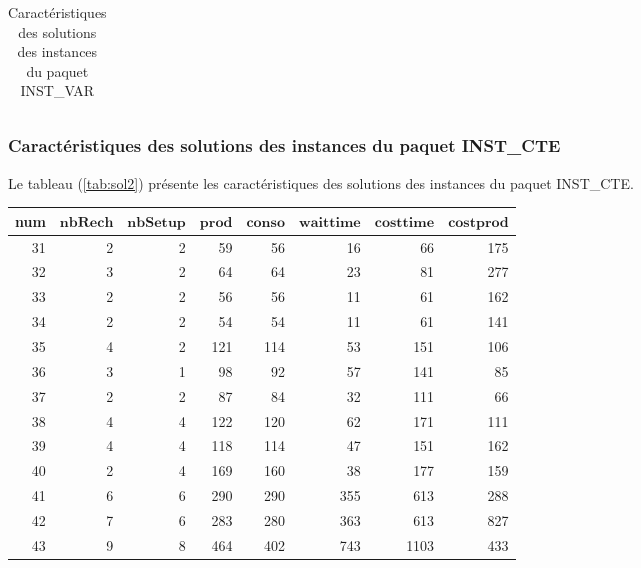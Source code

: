 {\begin{table}[H]
{\begin{tabular}{|r|r|r|r|r|r|r|r|}
			
			\bottomrule
		\end{tabular}%
	}\caption{Caractéristiques des solutions des instances du paquet INST\_VAR}
	\label{tab:sol}%
\end{table}%
\subsubsection{Caractéristiques des solutions des instances du paquet INST\_CTE}
Le tableau (\ref{tab:sol2}) présente les caractéristiques des solutions des instances du paquet INST\_CTE. %
\begin{table}[H]
	\centering
	\small{
		\begin{tabular}{|r|r|r|r|r|r|r|r|}
			\hline
			\toprule
			\rowcolor{cyan}	\textbf{num} &$\mathbf{nbRech}$ & $\mathbf{nbSetup}$ & $\mathbf{prod}$ &  $\mathbf{conso} $ & $\mathbf{wait time}$ & $\mathbf{cost time}$ & $\mathbf{cost prod}$  \\
			\midrule
			\hline
			31	&	2	&	2	&	59	&	56	&	16	&	66	&	175	\\ \hline
			32	&	3	&	2	&	64	&	64	&	23	&	81	&	277	\\ \hline
			33	&	2	&	2	&	56	&	56	&	11	&	61	&	162	\\ \hline
			34	&	2	&	2	&	54	&	54	&	11	&	61	&	141	\\ \hline
			35	&	4	&	2	&	121	&	114	&	53	&	151	&	106	\\ \hline
			36	&	3	&	1	&	98	&	92	&	57	&	141	&	85	\\ \hline
			37	&	2	&	2	&	87	&	84	&	32	&	111	&	66	\\ \hline
			38	&	4	&	4	&	122	&	120	&	62	&	171	&	111	\\ \hline
			39	&	4	&	4	&	118	&	114	&	47	&	151	&	162	\\ \hline
			40	&	2	&	4	&	169	&	160	&	38	&	177	&	159	\\ \hline
			41	&	6	&	6	&	290	&	290	&	355	&	613	&	288	\\ \hline
			42	&	7	&	6	&	283	&	280	&	363	&	613	&	827	\\ \hline
			43	&	9	&	8	&	464	&	402	&	743	&	1103	&	433	\\ \hline

\end{tabular}}
\end{table}}

